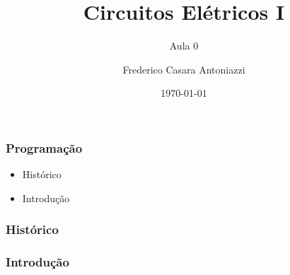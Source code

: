 \documentclass[12pt]{beamer}
\begin{document}
	\author{Frederico Casara Antoniazzi}
	\title{Circuitos Elétricos I}
	\subtitle{Aula 0}
	\date{\today}
	
	\begin{frame}[plain]
		\maketitle
	\end{frame}
	
	\begin{frame}
		\frametitle{Programação}
		
		\begin{itemize}
			\item Histórico
			\item Introdução
		\end{itemize}
		
	\end{frame}
	
	\begin{frame}
		\frametitle{Histórico}
	\end{frame}
	
	\begin{frame}
		\frametitle{Introdução}
	\end{frame}
	
	\begin{frame}
		\frametitle{}
	\end{frame}
	
	\begin{frame}
		\frametitle{}
	\end{frame}
	
\end{document}
